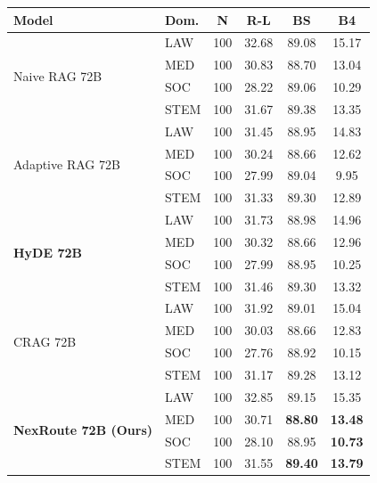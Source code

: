 \documentclass[a4paper,fleql]{cas-sc}
\begin{document}
\vspace{6pt plus 4pt minus 3pt}
\vspace{6pt plus 4pt minus 3pt}

\begin{center}
\begingroup
\small %
\renewcommand{\arraystretch}{0.9}
\label{tab:domain_breakdown_72b}
\begin{tabular}{llcccc}
\toprule
\textbf{Model} & \textbf{Dom.} & \textbf{N} & \textbf{R-L} & \textbf{BS} & \textbf{B4} \\
\midrule
\multirow{4}{*}{Naive RAG 72B}
  & LAW  & 100 & 32.68 & 89.08 & 15.17 \\
  & MED  & 100 & 30.83 & 88.70 & 13.04 \\
  & SOC  & 100 & 28.22 & 89.06 & 10.29 \\
  & STEM & 100 & 31.67 & 89.38 & 13.35 \\
\midrule
\multirow{4}{*}{Adaptive RAG 72B}
  & LAW  & 100 & 31.45 & 88.95 & 14.83 \\
  & MED  & 100 & 30.24 & 88.66 & 12.62 \\
  & SOC  & 100 & 27.99 & 89.04 &  9.95 \\
  & STEM & 100 & 31.33 & 89.30 & 12.89 \\
\midrule
\multirow{4}{*}{\textbf{HyDE 72B}}
  & LAW  & 100 & 31.73 & 88.98 & 14.96 \\
  & MED  & 100 & 30.32 & 88.66 & 12.96 \\
  & SOC  & 100 & 27.99 & 88.95 & 10.25 \\
  & STEM & 100 & 31.46 & 89.30 & 13.32 \\
\midrule
\multirow{4}{*}{CRAG 72B}
  & LAW  & 100 & 31.92 & 89.01 & 15.04 \\
  & MED  & 100 & 30.03 & 88.66 & 12.83 \\
  & SOC  & 100 & 27.76 & 88.92 & 10.15 \\
  & STEM & 100 & 31.17 & 89.28 & 13.12 \\
\midrule
\multirow{4}{*}{\textbf{NexRoute 72B (Ours)}}
  & LAW  & 100 & 32.85 & 89.15 & 15.35 \\
  & MED  & 100 & 30.71 & \textbf{88.80} & \textbf{13.48} \\
  & SOC  & 100 & 28.10 & 88.95 & \textbf{10.73} \\
  & STEM & 100 & 31.55 & \textbf{89.40} & \textbf{13.79} \\
\bottomrule
\end{tabular}
\endgroup
\end{center}
\end{document}

